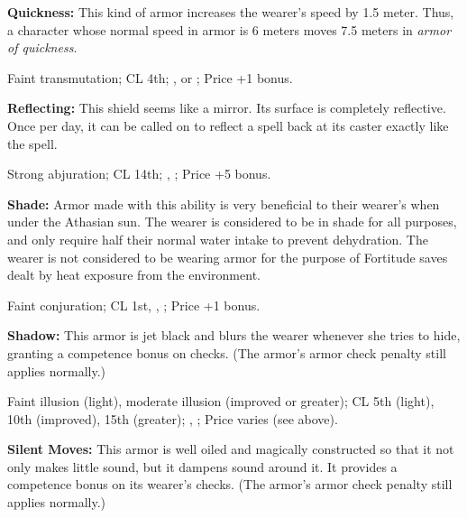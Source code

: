 \textbf{Quickness:} This kind of armor increases the wearer's speed by 1.5 meter. Thus, a character whose normal speed in armor is 6 meters moves 7.5 meters in \emph{armor of quickness}.

Faint transmutation; CL 4th; ,  or ; Price +1 bonus.

\textbf{Reflecting:} This shield seems like a mirror. Its surface is completely reflective. Once per day, it can be called on to reflect a spell back at its caster exactly like the  spell.

Strong abjuration; CL 14th; , ; Price +5 bonus. 

\textbf{Shade:} Armor made with this ability is very beneficial to their wearer's when under the Athasian sun. The wearer is considered to be in shade for all purposes, and only require half their normal water intake to prevent dehydration. The wearer is not considered to be wearing armor for the purpose of Fortitude saves dealt by heat exposure from the environment.

Faint conjuration; CL 1st, , ; Price +1 bonus.

\textbf{Shadow:} This armor is jet black and blurs the wearer whenever she tries to hide, granting a competence bonus on  checks. (The armor's armor check penalty still applies normally.)


Faint illusion (light), moderate illusion (improved or greater); CL 5th (light), 10th (improved), 15th (greater); , ; Price varies (see above).

\textbf{Silent Moves:} This armor is well oiled and magically constructed so that it not only makes little sound, but it dampens sound around it. It provides a competence bonus on its wearer's  checks. (The armor's armor check penalty still applies normally.)


